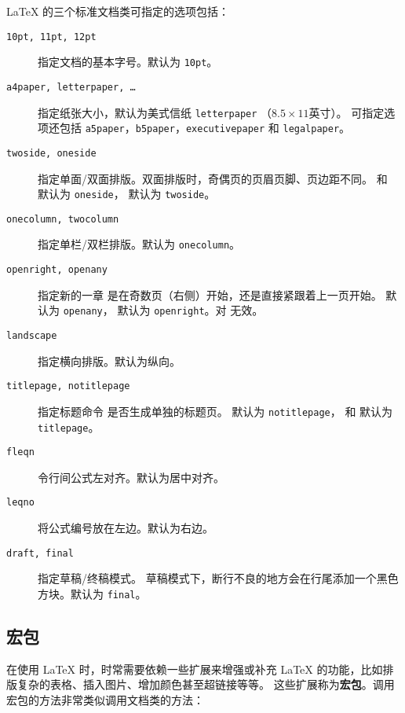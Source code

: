 \LaTeX{} 的三个标准文档类可指定的选项包括：
\begin{description}
\item[\texttt{10pt, 11pt, 12pt}] \quad 指定文档的基本字号。默认为 \texttt{10pt}。
\item[\texttt{a4paper, letterpaper, \ldots}] \quad 指定纸张大小，默认为美式信纸 \texttt{letterpaper} （$8.5\times11$英寸）。
可指定选项还包括 \texttt{a5paper}，\texttt{b5paper}，\texttt{executivepaper} 和 \texttt{legalpaper}。
\item[\texttt{twoside, oneside}] \quad 指定单面/双面排版。双面排版时，奇偶页的页眉页脚、页边距不同。
 和  默认为 \texttt{oneside}， 默认为 \texttt{twoside}。
\item[\texttt{onecolumn, twocolumn}] \quad 指定单栏/双栏排版。默认为 \texttt{onecolumn}。
\item[\texttt{openright, openany}] \quad 指定新的一章  是在奇数页（右侧）开始，还是直接紧跟着上一页开始。
 默认为 \texttt{openany}， 默认为 \texttt{openright}。对  无效。
\item[\texttt{landscape}] \quad 指定横向排版。默认为纵向。
\item[\texttt{titlepage, notitlepage}] 指定标题命令  是否生成单独的标题页。
 默认为 \texttt{notitlepage}， 和  默认为 \texttt{titlepage}。
\item[\texttt{fleqn}] \quad 令行间公式左对齐。默认为居中对齐。
\item[\texttt{leqno}] \quad 将公式编号放在左边。默认为右边。
\item[\texttt{draft, final}] \quad 指定草稿/终稿模式。
草稿模式下，断行不良的地方会在行尾添加一个黑色方块。默认为 \texttt{final}。
\end{description}

\subsection{宏包}\label{subsec:packages}

在使用 \LaTeX{} 时，时常需要依赖一些扩展来增强或补充 \LaTeX{} 的功能，比如排版复杂的表格、插入图片、增加颜色甚至超链接等等。
这些扩展称为\textbf{宏包}。调用宏包的方法非常类似调用文档类的方法：
\begin{command}
\end{command}

